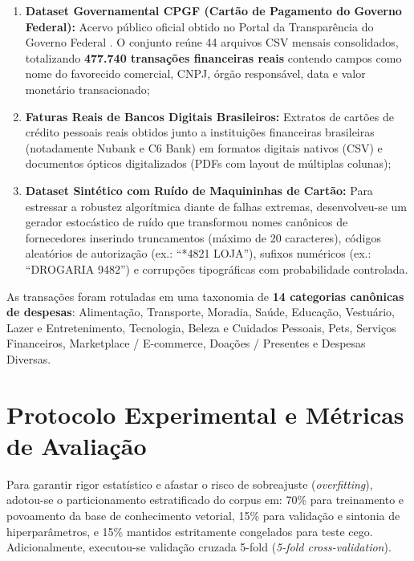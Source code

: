 \documentclass[
	12pt,				
	openright,			
	oneside,			
	a4paper,			
	english,			
	brazil				
	]{abntex2}
\begin{document}
\begin{enumerate}
    \item \textbf{Dataset Governamental CPGF (Cartão de Pagamento do Governo Federal):} Acervo público oficial obtido no Portal da Transparência do Governo Federal \cite{spcbrasil2024controle}. O conjunto reúne 44 arquivos CSV mensais consolidados, totalizando \textbf{477.740 transações financeiras reais} contendo campos como nome do favorecido comercial, CNPJ, órgão responsável, data e valor monetário transacionado;
    \item \textbf{Faturas Reais de Bancos Digitais Brasileiros:} Extratos de cartões de crédito pessoais reais obtidos junto a instituições financeiras brasileiras (notadamente Nubank e C6 Bank) em formatos digitais nativos (CSV) e documentos ópticos digitalizados (PDFs com layout de múltiplas colunas);
    \item \textbf{Dataset Sintético com Ruído de Maquininhas de Cartão:} Para estressar a robustez algorítmica diante de falhas extremas, desenvolveu-se um gerador estocástico de ruído que transformou nomes canônicos de fornecedores inserindo truncamentos (máximo de 20 caracteres), códigos aleatórios de autorização (ex.: ``*4821 LOJA''), sufixos numéricos (ex.: ``DROGARIA 9482'') e corrupções tipográficas com probabilidade controlada.
\end{enumerate}

As transações foram rotuladas em uma taxonomia de \textbf{14 categorias canônicas de despesas}: Alimentação, Transporte, Moradia, Saúde, Educação, Vestuário, Lazer e Entretenimento, Tecnologia, Beleza e Cuidados Pessoais, Pets, Serviços Financeiros, Marketplace / E-commerce, Doações / Presentes e Despesas Diversas.

\section{Protocolo Experimental e Métricas de Avaliação}
\label{sec:val_protocolo}

Para garantir rigor estatístico e afastar o risco de sobreajuste (\textit{overfitting}), adotou-se o particionamento estratificado do corpus em: 70\% para treinamento e povoamento da base de conhecimento vetorial, 15\% para validação e sintonia de hiperparâmetros, e 15\% mantidos estritamente congelados para teste cego. Adicionalmente, executou-se validação cruzada 5-fold (\textit{5-fold cross-validation}).
\end{document}
